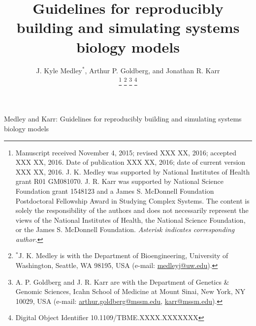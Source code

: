 \documentclass[journal,transmag,twoside]{IEEEtran}
\newcommand{\email}[1]{\href{mailto:#1}{#1}}
\begin{document}
\newcommand{\thetitle}{Guidelines for reproducibly building and simulating systems biology models}
\title{\thetitle}

\author{
    J. Kyle Medley$^*$,
    Arthur P. Goldberg, and
	Jonathan R. Karr
    
    \thanks{
        Manuscript received November 4, 2015; revised XXX XX, 2016; accepted XXX XX, 2016. Date of publication XXX XX, 2016; date of current version XXX XX, 2016.
        J. K. Medley was supported by National Institutes of Health grant R01 GM081070. J. R. Karr was supported by National Science Foundation grant 1548123 and a James S. McDonnell Foundation Postdoctoral Fellowship Award in Studying Complex Systems. The content is solely the responsibility of the authors and does not necessarily represent the views of the National Institutes of Health, the National Science Foundation, or the James S. McDonnell Foundation.
        \textit{Asterisk indicates corresponding author.}
    }
    \thanks{$^*$J. K. Medley is with the Department of Bioengineering, University of Washington, Seattle, WA 98195, USA (e-mail: \email{medleyj@uw.edu}).}
    \thanks{A. P. Goldberg and J. R. Karr are with the Department of Genetics \& Genomic Sciences, Icahn School of Medicine at Mount Sinai, New York, NY 10029, USA (e-mail: \email{arthur.goldberg@mssm.edu}, \email{karr@mssm.edu}).}
    \thanks{Digital Object Identifier 10.1109/TBME.XXXX.XXXXXXX}
}

%
{Medley and Karr: \thetitle}
% 








\maketitle
\end{document}
